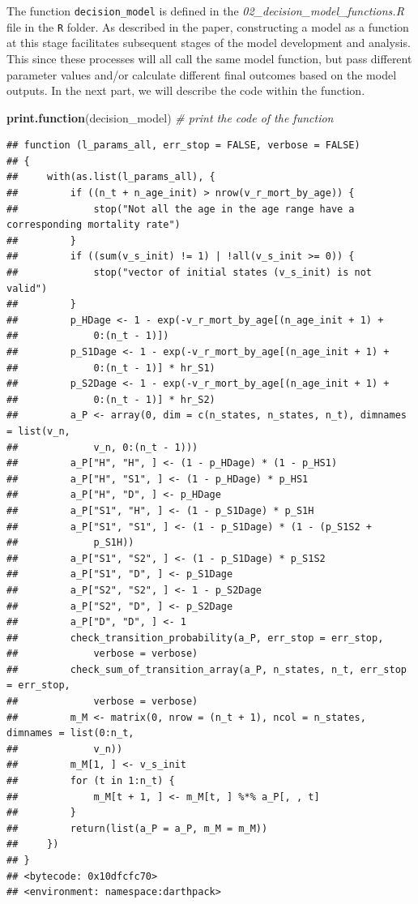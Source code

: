 \documentclass[
]{book}
\newenvironment{Shaded}{\begin{snugshade}}{\end{snugshade}}
\newcommand{\CommentTok}[1]{\textcolor[rgb]{0.56,0.35,0.01}{\textit{#1}}}
\newcommand{\FunctionTok}[1]{\textcolor[rgb]{0.13,0.29,0.53}{\textbf{#1}}}
\newcommand{\NormalTok}[1]{#1}
\begin{document}
The function \texttt{decision\_model} is defined in the \emph{02\_decision\_model\_functions.R} file in the \texttt{R} folder. As described in the paper, constructing a model as a function at this stage facilitates subsequent stages of the model development and analysis. This since these processes will all call the same model function, but pass different parameter values and/or calculate different final outcomes based on the model outputs. In the next part, we will describe the code within the function.

\begin{Shaded}
\begin{Highlighting}[]
\FunctionTok{print.function}\NormalTok{(decision\_model) }\CommentTok{\# print the code of the function}
\end{Highlighting}
\end{Shaded}

\begin{verbatim}
## function (l_params_all, err_stop = FALSE, verbose = FALSE) 
## {
##     with(as.list(l_params_all), {
##         if ((n_t + n_age_init) > nrow(v_r_mort_by_age)) {
##             stop("Not all the age in the age range have a corresponding mortality rate")
##         }
##         if ((sum(v_s_init) != 1) | !all(v_s_init >= 0)) {
##             stop("vector of initial states (v_s_init) is not valid")
##         }
##         p_HDage <- 1 - exp(-v_r_mort_by_age[(n_age_init + 1) + 
##             0:(n_t - 1)])
##         p_S1Dage <- 1 - exp(-v_r_mort_by_age[(n_age_init + 1) + 
##             0:(n_t - 1)] * hr_S1)
##         p_S2Dage <- 1 - exp(-v_r_mort_by_age[(n_age_init + 1) + 
##             0:(n_t - 1)] * hr_S2)
##         a_P <- array(0, dim = c(n_states, n_states, n_t), dimnames = list(v_n, 
##             v_n, 0:(n_t - 1)))
##         a_P["H", "H", ] <- (1 - p_HDage) * (1 - p_HS1)
##         a_P["H", "S1", ] <- (1 - p_HDage) * p_HS1
##         a_P["H", "D", ] <- p_HDage
##         a_P["S1", "H", ] <- (1 - p_S1Dage) * p_S1H
##         a_P["S1", "S1", ] <- (1 - p_S1Dage) * (1 - (p_S1S2 + 
##             p_S1H))
##         a_P["S1", "S2", ] <- (1 - p_S1Dage) * p_S1S2
##         a_P["S1", "D", ] <- p_S1Dage
##         a_P["S2", "S2", ] <- 1 - p_S2Dage
##         a_P["S2", "D", ] <- p_S2Dage
##         a_P["D", "D", ] <- 1
##         check_transition_probability(a_P, err_stop = err_stop, 
##             verbose = verbose)
##         check_sum_of_transition_array(a_P, n_states, n_t, err_stop = err_stop, 
##             verbose = verbose)
##         m_M <- matrix(0, nrow = (n_t + 1), ncol = n_states, dimnames = list(0:n_t, 
##             v_n))
##         m_M[1, ] <- v_s_init
##         for (t in 1:n_t) {
##             m_M[t + 1, ] <- m_M[t, ] %*% a_P[, , t]
##         }
##         return(list(a_P = a_P, m_M = m_M))
##     })
## }
## <bytecode: 0x10dfcfc70>
## <environment: namespace:darthpack>
\end{verbatim}
\end{document}
